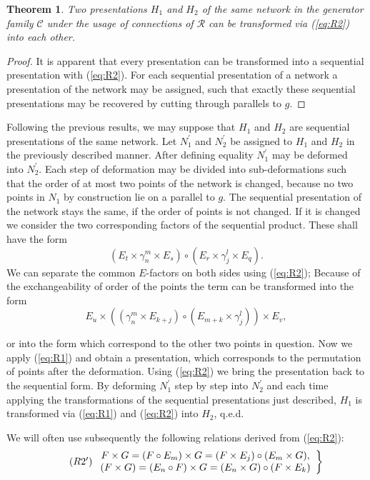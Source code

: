 \documentclass{article}
\newtheorem{theorem}{Theorem}
\begin{document}
\begin{theorem}
Two presentations $H_1$ and $H_2$ of the same network in the generator family $\mathcal{C}$ under the usage of connections of $\mathcal{R}$ can be transformed via (\ref{eq:R2}) into each other.
\end{theorem}
\begin{proof}
It is apparent that every presentation can be transformed into a sequential presentation with (\ref{eq:R2}). For each sequential presentation of a network a presentation of the network may be assigned, such that exactly these sequential presentations may be recovered by cutting through parallels to $g$.
\end{proof}

Following the previous results, we may suppose that $H_1$ and $H_2$ are sequential presentations of the same network. Let $N_1^{\prime}$ and $N_2^{\prime}$ be assigned to $H_1$ and $H_2$ in the previously described manner. After defining equality $N_1^{\prime}$ may be deformed into $N_2^{\prime}$. Each step of deformation may be divided into sub-deformations such that the order of at most two points of the network is changed, because no two points in $N_1$ by construction lie on a parallel to $g$. The sequential
presentation of the network stays the same, if the order of points is not changed. If it is changed we consider the two corresponding factors of the sequential product. These shall have the form
\[
(E_t \times \gamma_n^m \times E_s) \circ (E_r \times \gamma_j^l \times E_q).
\]
We can separate the common $E$-factors on both sides using (\ref{eq:R2}); Because of the exchangeability of order of the points the term can be transformed into the form
\[
  E_u \times ((\gamma_n^m \times E_{k+j}) \circ (E_{m+k} \times \gamma_j^l)) \times E_v,
\]

or into the form which correspond to the other two points in question. Now we apply (\ref{eq:R1}) and obtain a presentation, which corresponds to the permutation of points after the deformation. Using (\ref{eq:R2}) we bring the presentation back to the sequential form. By deforming $N_1^{\prime}$ step by step into $N_2^{\prime}$ and each time applying the transformations of the sequential presentations just described, $H_1$ is transformed via (\ref{eq:R1}) and (\ref{eq:R2}) into $H_2$, q.e.d.

We will often use subsequently the following relations derived from (\ref{eq:R2}):
\begin{equation}
\label{eq:r2prime}
\tag{$R2^{\prime}$}
\left.
  \begin{array}{c}
  F \times G = (F \circ E_m) \times G = (F\times E_j) \circ (E_m \times G), \\
    (F \times G) = (E_n \circ F) \times G = (E_n \times G) \circ (F \times E_k)
\end{array}
\right\}
\end{equation}
\end{document}

